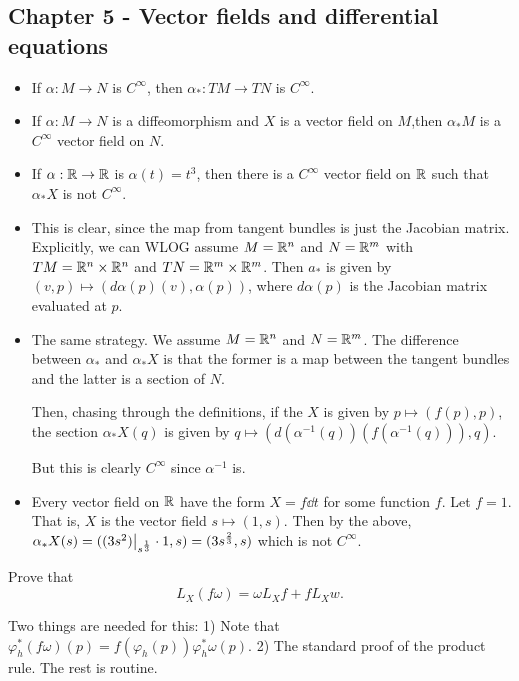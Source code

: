 \documentclass[11pt, english]{article}
\begin{document}
\subsection{Chapter 5 - Vector fields and differential equations}

\begin{exc}[Exercise 1]
\begin{itemize}
\item If $\alpha:M \to N$ is $C^\infty$, then $\alpha_\ast:TM \to TN$ is $C^\infty$. 
\item If $\alpha:M \to N$ is a diffeomorphism and $X$ is a vector field on $M$,then $\alpha_\ast M$ is a $C^\infty$ vector field on $N$.
\item If $\alpha: \mathbb{R} \to \mathbb{R}$ is $\alpha(t)=t^3$, then there is a $C^\infty$ vector field on $\mathbb{R}$ such that $\alpha_\ast X$ is not $C^\infty$.
\end{itemize}
\end{exc}

\begin{sol}
\begin{itemize}
\item This is clear, since the map from tangent bundles is just the Jacobian matrix. Explicitly, we can WLOG assume $M=\mathbb{R}^n$ and $N=\mathbb{R}^m$ with $TM=\mathbb{R}^n \times \mathbb{R}^n$ and $TN= \mathbb{R}^m \times \mathbb{R}^m$. Then $a_\ast$ is given by $(v,p) \mapsto (d\alpha(p)(v), \alpha(p))$, where $d\alpha(p)$ is the Jacobian matrix evaluated at $p$.
\item The same strategy. We assume $M= \mathbb{R}^n$ and $N=\mathbb{R}^m$. The difference between $\alpha_\ast$ and $\alpha_\ast X$ is that the former is a map between the tangent bundles and the latter is a section of $N$.

Then, chasing through the definitions, if the $X$ is given by $p \mapsto (f(p),p)$, the section $\alpha_\ast X ( q) $ is given by $ q \mapsto \left(d(\alpha^{-1}(q))(f(\alpha^{-1}(q))),q\right)$.

But this is clearly $C^\infty$ since $\alpha^{-1}$ is.

\item Every vector field on $\mathbb{R}$ have the form $X=f \dd{}{t}$ for some function $f$. Let $f=1$. That is, $X$ is the vector field $s \mapsto (1,s)$. Then by the above, $\alpha_\ast X(s)=(\restr{(3s^2)}{s^{\frac 13}} \cdot 1 , s) = (3s^{\frac 23},s)$ which is not $C^\infty$. 
\end{itemize}
\end{sol}

\begin{exc}[Exercise 10a]
Prove that
\[
L_X(f \omega ) = \omega L_X f + f L_X w.
\]
\end{exc}
\begin{sol}
Two things are needed for this: 1) Note that $\varphi_h^\ast(f \omega)(p) = f(\varphi_h(p)) \varphi_h^\ast \omega(p)$. 2) The standard proof of the product rule. The rest is routine.
\end{sol}
\end{document}
